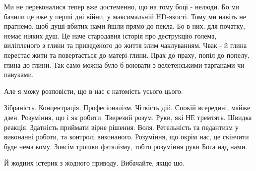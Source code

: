 Ми не переконалися тепер вже достеменно, що на тому боці - нелюди. Бо ми бачили
це вже у перші дні війни, у максимальній HD-якості. Тому ми навіть не прагнемо,
щоб душі вбитих нами йшли прямо до пекла. Бо в них, для початку, немає ніяких
душ. Це наче стародавня історія про деструкцію голема, виліпленого з глини та
приведеного до життя злим чаклуванням. Чвак - й глина перестає жити та
повертається до матері-глини. Прах до праху, попіл до попелу, глина до глини.
Так само можна було б воювати з велетенськими тарганами чи павуками.

Але я можу розповісти, що в  нас є натомість усього цього.

Зібраність. Концентрація. Професіоналізм. Чіткість дій. Спокій всередині, майже
дзен. Розуміння, що і як робити. Тверезий розум. Руки, які НЕ тремтять. Швидка
реакція. Здатність приймати вірне рішення. Воля. Ретельність та педантизм у
виконанні роботи, та контролі виконаного. Розуміння, що окрім нас, це скінчити
буде нема кому. Зовсім трошки фаталізму, тобто розуміння руки Бога над нами.

Й жодних істерик з жодного приводу. Вибачайте, якщо шо.
